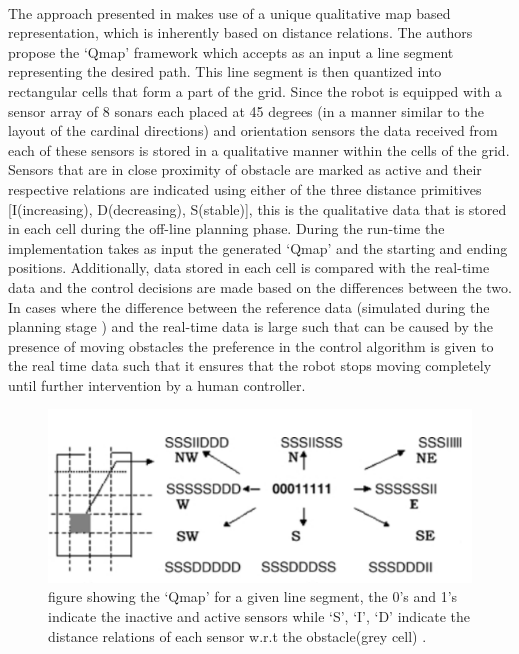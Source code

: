	\paragraph{}The approach presented in \cite{sgouros2002qualitative} makes use of a unique qualitative map based representation, which is inherently based on distance relations. The authors propose the `Qmap' framework which accepts as an input a line segment representing the desired path. This line segment is then quantized into rectangular cells that form a part of the grid. Since the robot is equipped with a sensor array of 8 sonars each placed at 45 degrees (in a manner similar to the layout of the cardinal directions) and orientation sensors the data received from each of these sensors is stored in a qualitative manner within the cells of the grid. Sensors that are in close proximity of obstacle are marked as active and their respective relations are indicated using either of the three distance primitives [I(increasing), D(decreasing), S(stable)], this is the qualitative data that is stored in each cell during the off-line planning phase. During the run-time the implementation takes as input the generated `Qmap' and the starting and ending positions. Additionally, data stored in each cell is compared with the real-time data and the control decisions are made based on the differences between the two. In cases where the difference between the reference data (simulated during the planning stage ) and the real-time data is large such that can be caused by the presence of moving obstacles the preference in the control algorithm is given to the real time data such that it ensures that the robot stops moving completely until further intervention by a human controller.
	\begin{figure}[h]
		\centering
		\includegraphics[scale=0.7]{images/Qmap}
		\caption{figure showing the `Qmap' for a given line segment, the 0's and 1's indicate the inactive and active sensors while `S', `I', `D' indicate the distance relations of each sensor w.r.t the obstacle(grey cell) \cite{sgouros2002qualitative}.}
		\label{fig:qmap}
	\end{figure}
	
